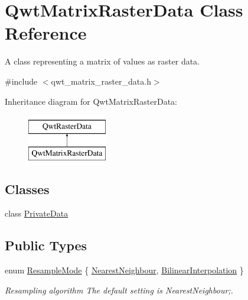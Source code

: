 \hypertarget{class_qwt_matrix_raster_data}{\section{Qwt\-Matrix\-Raster\-Data Class Reference}
\label{class_qwt_matrix_raster_data}
}


A class representing a matrix of values as raster data.  




{\ttfamily \#include $<$qwt\-\_\-matrix\-\_\-raster\-\_\-data.\-h$>$}

Inheritance diagram for Qwt\-Matrix\-Raster\-Data\-:\begin{figure}[H]
\begin{center}
\leavevmode
\includegraphics[height=2.000000cm]{class_qwt_matrix_raster_data}
\end{center}
\end{figure}
\subsection*{Classes}
\begin{DoxyCompactItemize}
\item 
class \hyperlink{class_qwt_matrix_raster_data_1_1_private_data}{Private\-Data}
\end{DoxyCompactItemize}
\subsection*{Public Types}
\begin{DoxyCompactItemize}
\item 
enum \hyperlink{class_qwt_matrix_raster_data_a3c8def5d9ae452bd82e6c4b71b480209}{Resample\-Mode} \{ \hyperlink{class_qwt_matrix_raster_data_a3c8def5d9ae452bd82e6c4b71b480209acaa0a9e3b8afd376472d6a587a3f9873}{Nearest\-Neighbour}, 
\hyperlink{class_qwt_matrix_raster_data_a3c8def5d9ae452bd82e6c4b71b480209a6f25a9f1f27cb94525ce39df487af13f}{Bilinear\-Interpolation}
 \}
\begin{DoxyCompactList}\small\item\em Resampling algorithm The default setting is Nearest\-Neighbour;. \end{DoxyCompactList}\end{DoxyCompactItemize}
